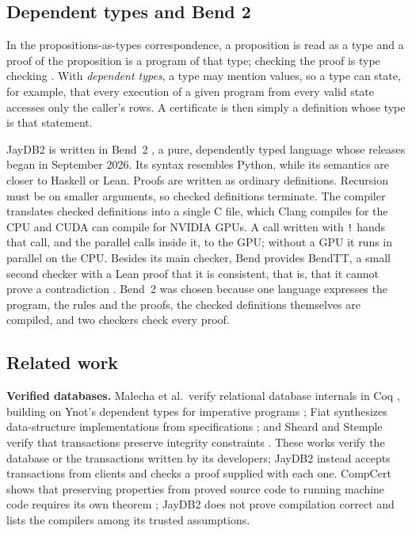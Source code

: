 \documentclass[12pt]{article}
\newcommand{\code}[1]{\texttt{#1}}
\begin{document}
\subsection{Dependent types and Bend 2}
In the propositions-as-types correspondence, a proposition is read as a type
and a proof of the proposition is a program of that type; checking the proof is
type checking \cite{wadler2015}. With \emph{dependent types}, a type may mention
values, so a type can state, for example, that every execution of a given
program from every valid state accesses only the caller's rows. A
certificate is then simply a definition whose type is that statement.

JayDB2 is written in Bend~2 \cite{bend}, a pure, dependently typed language
whose releases began in September 2026. Its syntax resembles
Python, while its semantics are closer to Haskell or Lean. Proofs are
written as ordinary definitions. Recursion must be on smaller arguments, so
checked definitions terminate. The
compiler translates checked definitions into a single C file, which Clang
compiles for the CPU and CUDA can compile for NVIDIA GPUs. A call written with
\code{!} hands that call, and the parallel calls inside it, to the GPU; without
a GPU it runs in parallel on the CPU. Besides its main checker, Bend provides BendTT, a
small second checker with a Lean proof that it is consistent, that is, that it
cannot prove a contradiction \cite{bend}. Bend~2 was chosen
because one language expresses the program, the rules and the proofs, the
checked definitions themselves are compiled, and two checkers check every proof.

\subsection{Related work}
\textbf{Verified databases.} Malecha et al.\ verify relational database
internals in Coq \cite{malecha2010}, building on Ynot's dependent types for
imperative programs \cite{ynot2008}; Fiat synthesizes data-structure
implementations from specifications \cite{fiat2015}; and Sheard and Stemple
verify that transactions preserve integrity constraints \cite{sheard1989}. These
works verify the database or the transactions written by its developers;
JayDB2 instead accepts transactions from clients and checks a proof supplied
with each one. CompCert shows that preserving properties from proved source code
to running machine code requires its own theorem \cite{leroy2009}; JayDB2 does
not prove compilation correct and lists the compilers among its trusted
assumptions.
\end{document}
